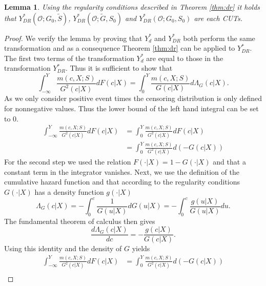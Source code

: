 \documentclass[12pt, a4paper]{scrartcl}
\theoremstyle{definition}
\theoremstyle{plain}
\newtheorem{Lemma}{Lemma}[section]
\numberwithin{equation}{section}
\numberwithin{figure}{section}
\numberwithin{table}{section}
\begin{document}
	\begin{Lemma}
		Using the regularity conditions described in Theorem \ref{thm:dr} it holds that $Y_{DR}^*(\mathcal{O}; G_0, \tilde{S})$, $Y_{DR}^*(\mathcal{O}; \tilde{G}, S_0)$ and $Y_{DR}^*(\mathcal{O}; G_0, S_0)$ are each CUTs.
	\end{Lemma}
	\begin{proof}
		We verify the lemma by proving that $Y_d^*$ and $Y_{DR}^*$ both perform the same transformation and as a consequence Theorem \ref{thm:dr} can be applied to $Y_{DR}^*$.
		The first two terms of the transformation $Y_d^*$ are equal to those in the transformation $Y_{DR}^*$.
		Thus it is sufficient to show that
		\begin{equation*}
		\int_{-\infty}^{Y}\frac{m(c,X;S)}{G^2(c\vert X)}dF(c\vert X) = \int_{0}^{Y} \frac{m(c,X;S)}{G(c \vert X)} d\Lambda_G(c \vert X).
		\end{equation*}
		As we only consider positive event times the censoring distribution is only defined for nonnegative values.
		Thus the lower bound of the left hand integral can be set to 0.
		\begin{equation*}
		\begin{split}
		\int_{-\infty}^{Y}\frac{m(c,X;S)}{G^2(c\vert X)}dF(c\vert X) &= \int_{0}^{Y}\frac{m(c,X;S)}{G^2(c\vert X)}dF(c\vert X)\\
		&= \int_{0}^{Y}\frac{m(c,X;S)}{G^2(c\vert X)}d(-G(c\vert X))
		\end{split}
		\end{equation*}
		For the second step we used the relation $F(\cdot\vert X)= 1-G(\cdot\vert X)$ and that a constant term in the integrator vanishes.
		Next, we use the definition of the cumulative hazard function and that according to the regularity conditions $G(\cdot \vert X)$ has a density function $g(\cdot \vert X)$
		\begin{equation*}
			\Lambda_G(c \vert X) = - \int_{0}^{c}\frac{1}{G(u\vert X)}dG(u\vert X) = - \int_{0}^{c}\frac{g(u\vert X)}{G(u\vert X)}du.
		\end{equation*}
		The fundamental theorem of calculus then gives
		\begin{equation*}
		\frac{d\Lambda_G(c \vert X)}{dc} = -\frac{g(c\vert X)}{G(c\vert X)}.
		\end{equation*}
		Using this identity and the density of $G$ yields
		\begin{equation*}
		\begin{split}
		\int_{-\infty}^{Y}\frac{m(c,X;S)}{G^2(c\vert X)}dF(c\vert X) &= \int_{0}^{Y}\frac{m(c,X;S)}{G^2(c\vert X)}d(-G(c\vert X))\\

\end{split}
\end{equation*}
\end{proof}
\end{document}
